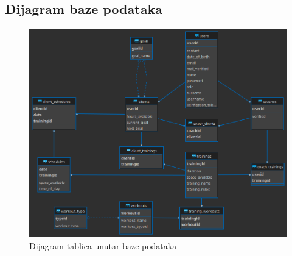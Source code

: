 		\subsection{Dijagram baze podataka}
			\begin{figure}[H]
		\includegraphics[scale=0.45]{./Dijagrami/relations.png}
		\centering
		\caption{Dijagram tablica unutar baze podataka}
		\label{fig:promjene}
	\end{figure}
		
		\eject
		
		
